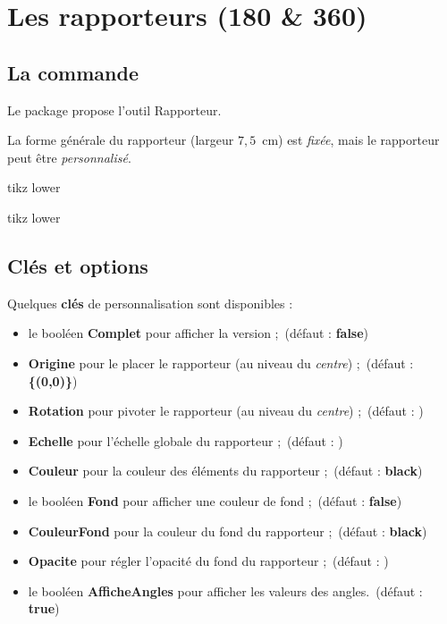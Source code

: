 \documentclass[french,a4paper,11pt]{article}
\newcommand\Cle[1]{{\bfseries\sffamily\textlangle #1\textrangle}}
\begin{document}
\section{Les rapporteurs (180 \&{} 360)}

\subsection{La commande}

\begin{cautionblock}
Le package propose l'outil \textsf{Rapporteur}.

La forme générale du rapporteur (largeur $7,5$~cm) est \textit{fixée}, mais le rapporteur peut être \textit{personnalisé}.
\end{cautionblock}

\begin{PresentationCode}{tikz lower}
\tkzRapporteur
\end{PresentationCode}

\begin{PresentationCode}{tikz lower}
\tkzRapporteur[Complet]
\end{PresentationCode}

\subsection{Clés et options}

\begin{tipblock}
Quelques \Cle{clés} de personnalisation sont disponibles :

\begin{itemize}
	\item le booléen \Cle{Complet} pour afficher la version  \fg{};\hfill~(défaut : \Cle{false})
	\item \Cle{Origine} pour le placer le rapporteur (au niveau du \textit{centre}) ;\hfill~(défaut : \Cle{\{(0,0)\}})
	\item \Cle{Rotation} pour pivoter le rapporteur (au niveau du \textit{centre}) ;\hfill~(défaut : \Cle{0})
	\item \Cle{Echelle} pour l'échelle globale du rapporteur ;\hfill~(défaut : \Cle{1})
	\item \Cle{Couleur} pour la couleur des éléments du rapporteur ;\hfill~(défaut : \Cle{black})
	\item le booléen \Cle{Fond} pour afficher une couleur de fond ;\hfill~(défaut : \Cle{false})
	\item \Cle{CouleurFond} pour la couleur du fond du rapporteur ;\hfill~(défaut : \Cle{black})
	\item \Cle{Opacite} pour régler l'opacité du fond du rapporteur ;\hfill~(défaut : \Cle{0.5})
	\item le booléen \Cle{AfficheAngles} pour afficher les valeurs des angles.\hfill~(défaut : \Cle{true})
\end{itemize}
\vspace*{-\baselineskip}\leavevmode
\end{tipblock}
\end{document}
